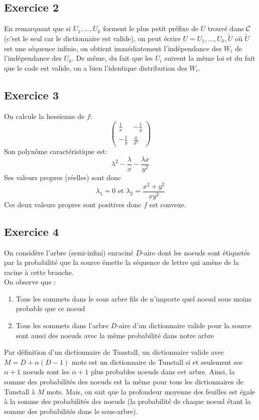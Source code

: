 \documentclass{cours}
\begin{document}
\subsection{Exercice 2}
En remarquant que si $U_{1},\ldots, U_{k}$ forment le plus petit préfixe de $U$ trouvé dans $\mathcal{C}$ (c'est le seul car le dictionnaire est valide), on peut écrire $U = U_{1}, \ldots, U_{k}, \tilde{U}$ où $\tilde{U}$ est une séquence infinie, on obtient immédiatement l'indépendance des $W_{i}$ de l'indépendance des $U_{k}$. De même, du fait que les $U_{i}$ suivent la même loi et du fait que le code est valide, on a bien l'identique distribution des $W_{i}$.

\subsection{Exercice 3}
On calcule la hessienne de $f$:
\[
	\begin{pmatrix}
		\frac{1}{x} & -\frac{1}{y}\\
		-\frac{1}{y} & \frac{x}{y^{2}}
	\end{pmatrix}
\]
Son polynôme caractéristique est: 
\[
	\lambda^{2} - \frac{\lambda}{x} - \frac{\lambda x}{y^{2}}
\]
Ses valeurs propres (réelles) sont donc 
\[
	\lambda_{1} = 0 \text{ et } \lambda_{2} = \frac{x^{2} + y^{2}}{xy^{2}}
\]
Ces deux valeurs propres sont positives donc $f$ est convexe. 

\subsection{Exercice 4}
On considère l'arbre (semi-infini) enraciné $D$-aire dont les noeuds sont étiquetés par la probabilité que la source émette la séquence de lettre qui amène de la racine à cette branche.\\
On observe que :
\begin{enumerate}
	\item Tous les sommets dans le sous arbre fils de n'importe quel noeud sous moins probable que ce noeud
	\item Tous les sommets dans l'arbre $D$-aire d'un dictionnaire valide pour la source sont aussi des noeuds avec la même probabilité dans notre arbre
\end{enumerate}
Par définition d'un dictionnaire de Tunstall, un dictionnaire valide avec $M = D + \alpha(D-1)$ mots est un dictionnaire de Tunstall si et seulement ses $\alpha + 1$ noeuds sont les $\alpha + 1$ plus probables noeuds dans cet arbre. 
Ainsi, la somme des probabilités des noeuds est la même pour tous les dictionnaires de Tunstall à $M$ mots. 
Mais, on sait que la profondeur moyenne des feuilles est égale à la somme des probabilités des noeuds (la probabilité de chaque noeud étant la somme des probabilités dans le sous-arbre).
\end{document}
